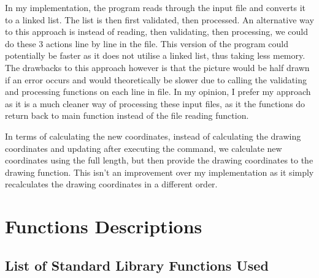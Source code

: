 \documentclass[a4paper, 12pt, titlepage]{article}
\begin{document}
In my implementation, the program reads through the input file and converts
it to a linked list. The list is then first validated, then processed. An
alternative way to this approach is instead of reading, then validating,
then processing, we could do these 3 actions line by line in the file.
This version of the program could potentially be faster as it does not
utilise a linked list, thus taking less memory. The drawbacks to this
approach however is that the picture would be half drawn if an error occurs
and would theoretically be slower due to calling the validating and
processing functions on each line in file. In my opinion, I prefer my
approach as it is a much cleaner way of processing these input files, as
it the functions do return back to main function instead of the file reading
function.

In terms of calculating the new coordinates, instead of calculating the
drawing coordinates and updating after executing the command, we calculate
new coordinates using the full length, but then provide the drawing
coordinates to the drawing function. This isn't an improvement over my
implementation as it simply recalculates the drawing coordinates in a
different order.

\newpage


\section{Functions Descriptions}

\subsection{List of Standard Library Functions Used}
\end{document}
